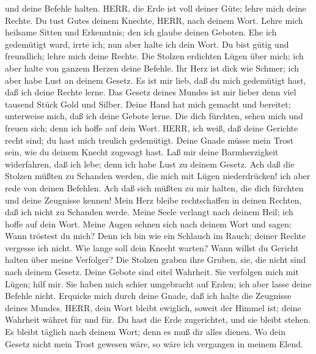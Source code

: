 und deine Befehle halten.  HERR, die Erde ist voll deiner
Güte; lehre mich deine Rechte.  Du tust Gutes deinem
Knechte, HERR, nach deinem Wort.  Lehre mich heilsame
Sitten und Erkenntnis; den ich glaube deinen Geboten.  Ehe
ich gedemütigt ward, irrte ich; nun aber halte ich dein Wort.
 Du bist gütig und freundlich; lehre mich deine Rechte.
 Die Stolzen erdichten Lügen über mich; ich aber halte von
ganzem Herzen deine Befehle.  Ihr Herz ist dick wie Schmer;
ich aber habe Lust an deinem Gesetz.  Es ist mir lieb, daß
du mich gedemütigt hast, daß ich deine Rechte lerne.  Das
Gesetz deines Mundes ist mir lieber denn viel tausend Stück Gold und
Silber.  Deine Hand hat mich gemacht und bereitet;
unterweise mich, daß ich deine Gebote lerne.  Die dich
fürchten, sehen mich und freuen sich; denn ich hoffe auf dein Wort.
 HERR, ich weiß, daß deine Gerichte recht sind; du hast
mich treulich gedemütigt.  Deine Gnade müsse mein Trost
sein, wie du deinem Knecht zugesagt hast.  Laß mir deine
Barmherzigkeit widerfahren, daß ich lebe; denn ich habe Lust zu deinem
Gesetz.  Ach daß die Stolzen müßten zu Schanden werden, die
mich mit Lügen niederdrücken! ich aber rede von deinen Befehlen.
 Ach daß sich müßten zu mir halten, die dich fürchten und
deine Zeugnisse kennen!  Mein Herz bleibe rechtschaffen in
deinen Rechten, daß ich nicht zu Schanden werde.  Meine
Seele verlangt nach deinem Heil; ich hoffe auf dein Wort. 
Meine Augen sehnen sich nach deinem Wort und sagen: Wann tröstest du
mich?  Denn ich bin wie ein Schlauch im Rauch; deiner
Rechte vergesse ich nicht.  Wie lange soll dein Knecht
warten? Wann willst du Gericht halten über meine Verfolger?
 Die Stolzen graben ihre Gruben, sie, die nicht sind nach
deinem Gesetz.  Deine Gebote sind eitel Wahrheit. Sie
verfolgen mich mit Lügen; hilf mir.  Sie haben mich schier
umgebracht auf Erden; ich aber lasse deine Befehle nicht. 
Erquicke mich durch deine Gnade, daß ich halte die Zeugnisse deines
Mundes.  HERR, dein Wort bleibt ewiglich, soweit der Himmel
ist;  deine Wahrheit währet für und für. Du hast die Erde
zugerichtet, und sie bleibt stehen.  Es bleibt täglich nach
deinem Wort; denn es muß dir alles dienen.  Wo dein Gesetz
nicht mein Trost gewesen wäre, so wäre ich vergangen in meinem Elend.
